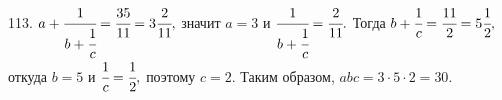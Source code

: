 113. $a+\cfrac{1}{b+\cfrac{1}{c}}=\cfrac{35}{11}=3\cfrac{2}{11},$ значит $a=3$ и $\cfrac{1}{b+\cfrac{1}{c}}=\cfrac{2}{11}.$ Тогда $b+\cfrac{1}{c}=\cfrac{11}{2}=5\cfrac{1}{2},$ откуда $b=5$ и $\cfrac{1}{c}=\cfrac{1}{2},$ поэтому $c=2.$ Таким образом, $abc=3\cdot5\cdot2=30.$\\
